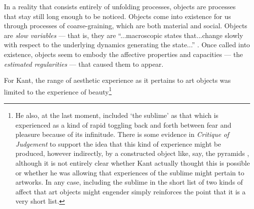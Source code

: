 \documentclass[letterpaper]{article}
\begin{document}
    In a reality that consists entirely of unfolding processes, objects are processes that stay still long enough to be noticed. Objects come into existence for us through processes of coarse-graining, which are both material and social. Objects are \emph{slow variables} — that is, they are “...macroscopic states that...change slowly with respect to the underlying dynamics generating the state...” \citep[p.61]{FlackEtAlTmsclsSymmtryUncrtnty2013}. Once called into existence, objects seem to embody the affective properties and capacities — the \emph{estimated regularities} \citep[p.9]{FlackCrsGrnng2017} — that caused them to appear.

    For Kant, the range of aesthetic experience as it pertains to art objects was limited to the experience of beauty\footnote{
        He also, at the last moment, included ‘the sublime’ \citep[p.15]{ZepkeSblmArt2017} as that which is experienced as a kind of rapid toggling back and forth between fear and pleasure \citep[p.88]{KantCrtqOfJdgmnt} because of its infinitude. There is some evidence in \emph{Critique of Judgement} to support the idea that this kind of experience might be produced, however indirectly, by a constructed object like, say, the pyramids \citep[p.82]{KantCrtqOfJdgmnt}, although it is not entirely clear whether Kant actually thought this is possible or whether he was allowing that experiences of the sublime might pertain to artworks. In any case, including the sublime in the short list of two kinds of affect that art objects might engender simply reinforces the point that it is a very short list.

}
\end{document}

